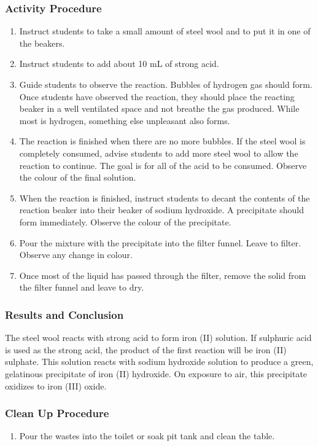 \subsubsection*{Activity Procedure}
\begin{enumerate}
\item{Instruct students to take a small amount of steel wool and to put it in one of the beakers.}
\item{Instruct students to add about 10 mL of strong acid.}
\item{Guide students to observe the reaction. Bubbles of hydrogen gas should form. Once students have observed the reaction, they should place the reacting beaker in a well ventilated space and not breathe the gas produced. While most is hydrogen, something else unpleasant also forms.}
\item{The reaction is finished when there are no more bubbles. If the steel wool is completely consumed, advise students to add more steel wool to allow the reaction to continue. The goal is for all of the acid to be consumed. Observe the colour of the final solution.}
\item{When the reaction is finished, instruct students to decant the contents of the reaction beaker into their beaker of sodium hydroxide. A precipitate should form immediately. Observe the colour of the precipitate.}
\item{Pour the mixture with the precipitate into the filter funnel. Leave to filter. Observe any change in colour.}
\item{Once most of the liquid has passed through the filter, remove the solid from the filter funnel and leave to dry.}
\end{enumerate}

\subsubsection*{Results and Conclusion}
The steel wool reacts with strong acid to form iron (II) solution. If sulphuric acid is used as the strong acid, the product of the first reaction will be iron (II) sulphate. This solution reacts with sodium hydroxide solution to produce a green, gelatinous precipitate of iron (II) hydroxide. On exposure to air, this precipitate oxidizes to iron (III) oxide.

\subsubsection*{Clean Up Procedure}
\begin{enumerate}
\item{Pour the wastes into the toilet or soak pit tank and clean the table.}
\end{enumerate}

